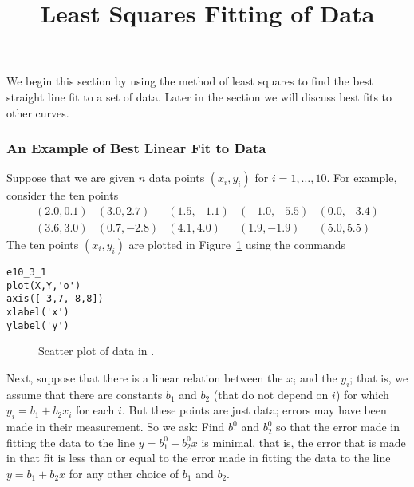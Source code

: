 \documentclass{ximera}
\title{Least Squares Fitting of Data}
\begin{document}
\begin{abstract}
\end{abstract}
\maketitle

 \label{S:7.6}

We begin this section by using the method of least squares to find the
best straight line fit to a set of data.  Later in the section we will
discuss best fits to other curves.

\subsubsection*{An Example of Best Linear Fit to Data}

Suppose that we are given $n$ data points
$(x_i,y_i)$ for $i=1,\ldots,10$.
For example, consider the ten points
\begin{equation*}  \label{E:scatterdata}
\begin{array}{ccccc}
(2.0,0.1) & (3.0,2.7) & (1.5,-1.1) & (-1.0,-5.5) & (0.0,-3.4)\\
(3.6,3.0) & (0.7,-2.8) & (4.1,4.0) & (1.9,-1.9) & (5.0,5.5) \end{array}
\end{equation*}
The ten points $(x_i,y_i)$ are plotted in Figure~\ref{F:linreg} using the
commands
\begin{verbatim}
e10_3_1
plot(X,Y,'o')
axis([-3,7,-8,8])
xlabel('x')
ylabel('y')
\end{verbatim}
\begin{figure}[htb]
     \centerline{%
     }
     \caption{Scatter plot of data in \protect{}.}
     \label{F:linreg}
\end{figure}

Next, suppose that there is a linear relation between the $x_i$ and the $y_i$;
that is, we assume that there are constants $b_1$ and $b_2$ (that do not
depend on $i$) for which $y_i=b_1+b_2x_i$ for each $i$. But these points are
just data; errors may have been made in their measurement.  So we ask:  Find
$b_1^0$ and $b_2^0$ so that the error made in fitting the data to the line
$y=b_1^0+b_2^0x$ is minimal, that is, the error that is made in that fit is
less than or equal to the error made in fitting the data to the line
$y=b_1+b_2x$ for any other choice of $b_1$ and $b_2$.
\end{document}
